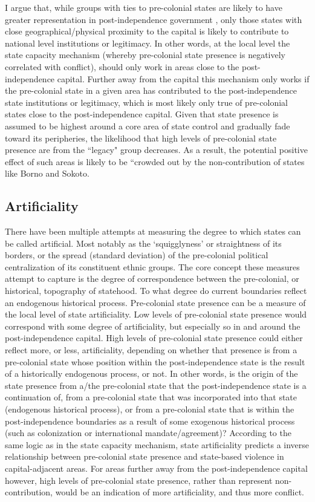 \documentclass[12pt]{article}
\begin{document}
I argue that, while groups with ties to pre-colonial states are likely to have
greater representation in post-independence government \citep{Paine2019}, only
those states with close geographical/physical proximity to the capital is likely
to contribute to national level institutions or legitimacy. In other words, at
the local level the state capacity mechanism (whereby pre-colonial state
presence is negatively correlated with conflict), should only work in areas
close to the post-independence capital. Further away from the capital this
mechanism only works if the pre-colonial state in a given area has contributed
to the post-independence state institutions or legitimacy, which is most likely
only true of pre-colonial states close to the post-independence capital. Given
that state presence is assumed to be highest around a core area of state control
and gradually fade toward its peripheries, the likelihood that high levels of
pre-colonial state presence are from the ``legacy" group decreases. As a
result, the potential positive effect of such areas is likely to be ``crowded
out by the non-contribution of states like Borno and Sokoto.

\subsection{Artificiality} \label{Artificiality}

There have been multiple attempts at measuring the degree to which states can be
called artificial. Most notably as the `squigglyness' or straightness of its
borders, or the spread (standard deviation) of the pre-colonial political
centralization of its constituent ethnic groups. The core concept these measures
attempt to capture is the degree of correspondence between the pre-colonial, or
historical, topography of statehood. To what degree do current boundaries
reflect an endogenous historical process. Pre-colonial state presence can be a
measure of the local level of state artificiality. Low levels of pre-colonial
state presence would correspond with some degree of artificiality, but
especially so in and around the post-independence capital. High levels of
pre-colonial state presence could either reflect more, or less, artificiality,
depending on whether that presence is from a pre-colonial state whose position
within the post-independence state is the result of a historically endogenous
process, or not. In other words, is the origin of the state presence from a/the
pre-colonial state that the post-independence state is a continuation of, from a
pre-colonial state that was incorporated into that state (endogenous historical
process), or from a pre-colonial state that is within the post-independence
boundaries as a result of some exogenous historical process (such as
colonization or international mandate/agreement)? According to the same logic as
in the state capacity mechanism, state artificiality predicts a inverse
relationship between pre-colonial state presence and state-based violence in
capital-adjacent areas. For areas further away from the post-independence
capital however, high levels of pre-colonial state presence, rather than
represent non-contribution, would be an indication of more artificiality, and
thus more conflict.
\end{document}
